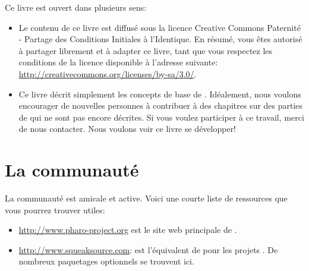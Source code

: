 \documentclass[a4paper,10pt,twoside]{book}
\begin{document}
Ce livre est ouvert dans plusieurs sens:

\begin{itemize}

\item	Le contenu de ce livre est diffus\'e sous la licence Creative Commons Paternit\'e - Partage des Conditions Initiales \`a l'Identique.
		En r\'esum\'e, vous \^etes autoris\'e \`a partager librement et \`a adapter ce livre, tant que vous respectez les conditions de la licence disponible \`a l'adresse suivante: 
		\url{http://creativecommons.org/licenses/by-sa/3.0/}.

\item	Ce livre d\'ecrit simplement les concepts de base de \pharo.
		Id\'ealement, nous voulons encourager de nouvelles personnes \`a contribuer \`a des chapitres sur des parties de \pharo qui ne sont pas encore d\'ecrites.
		Si vous voulez participer \`a ce travail, merci de nous contacter. Nous voulons voir ce livre se d\'evelopper!
\end{itemize}


\section*{La communaut\'e \pharo}

La communaut\'e \pharo est amicale et active.
Voici une courte liste de ressources que vous pourrez trouver utiles:

\begin{itemize}
\item \url{http://www.pharo-project.org} est le site web principale de \pharo.
\item \url{http://www.squeaksource.com}: \squeaksource est l'\'equivalent de
  \sourceforge pour les projets \pharo. De nombreux paquetages
  optionnels se trouvent ici.
\end{itemize}


\end{document}
